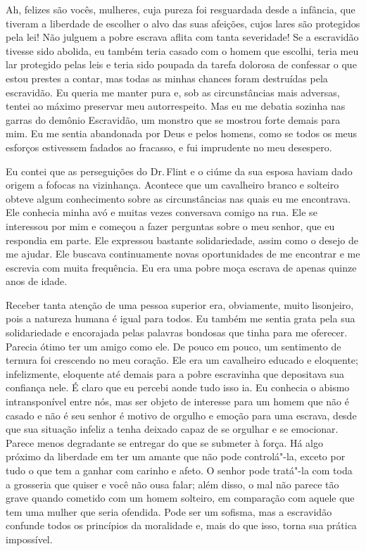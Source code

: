 Ah, felizes são vocês, mulheres, cuja
pureza foi resguardada desde a infância, que tiveram a liberdade de
escolher o alvo das suas afeições, cujos lares são protegidos pela lei!
Não julguem a pobre escrava aflita com tanta severidade! Se a escravidão
tivesse sido abolida, eu também teria casado com o homem que escolhi,
teria meu lar protegido pelas leis e teria sido poupada da tarefa
dolorosa de confessar o que estou prestes a contar, mas todas as minhas
chances foram destruídas pela escravidão. Eu queria me manter pura e,
sob as circunstâncias mais adversas, tentei ao máximo preservar meu
autorrespeito. Mas eu me debatia sozinha nas garras do demônio
Escravidão, um monstro que se mostrou forte demais para mim. Eu me
sentia abandonada por Deus e pelos homens, como se todos os meus
esforços estivessem fadados ao fracasso, e fui imprudente no meu
desespero.

Eu contei que as perseguições do Dr.\,Flint e o ciúme da sua esposa haviam dado origem a fofocas na
vizinhança. Acontece que um cavalheiro branco e solteiro obteve algum
conhecimento sobre as circunstâncias nas quais eu me encontrava. Ele
conhecia minha avó e muitas vezes conversava comigo na rua. Ele se
interessou por mim e começou a fazer perguntas sobre o meu senhor, que
eu respondia em parte. Ele expressou bastante solidariedade, assim como
o desejo de me ajudar. Ele buscava continuamente novas oportunidades de
me encontrar e me escrevia com muita frequência. Eu era uma pobre moça
escrava de apenas quinze anos de idade.

Receber tanta atenção de uma pessoa
superior era, obviamente, muito lisonjeiro, pois a natureza humana é
igual para todos. Eu também me sentia grata pela sua solidariedade e
encorajada pelas palavras bondosas que tinha para me oferecer. Parecia
ótimo ter um amigo como ele. De pouco em pouco, um sentimento de ternura
foi crescendo no meu coração. Ele era um cavalheiro educado e eloquente;
infelizmente, eloquente até demais para a pobre escravinha que
depositava sua confiança nele. É claro que eu percebi aonde tudo isso
ia. Eu conhecia o abismo intransponível entre nós, mas ser objeto de
interesse para um homem que não é casado e não é seu senhor é motivo de
orgulho e emoção para uma escrava, desde que sua situação infeliz a
tenha deixado capaz de se orgulhar e se emocionar. Parece menos
degradante se entregar do que se submeter à força. Há algo próximo da
liberdade em ter um amante que não pode controlá"-la, exceto por tudo o
que tem a ganhar com carinho e afeto. O senhor pode tratá"-la com toda a
grosseria que quiser e você não ousa falar; além disso, o mal não parece
tão grave quando cometido com um homem solteiro, em comparação com
aquele que tem uma mulher que seria ofendida. Pode ser um sofisma, mas a
escravidão confunde todos os princípios da moralidade e, mais do que
isso, torna sua prática impossível.

